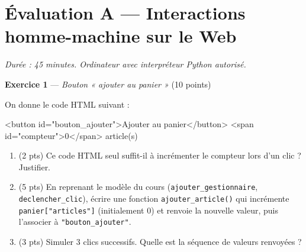 \section*{Évaluation A --- Interactions homme-machine sur le Web}
\textit{Durée : 45 minutes. Ordinateur avec interpréteur Python autorisé.}


\bigskip

\textbf{Exercice 1} --- \textit{Bouton « ajouter au panier »} \hfill (10 points)

On donne le code HTML suivant :
\begin{console}
<button id="bouton_ajouter">Ajouter au panier</button>
<span id="compteur">0</span> article(s)
\end{console}

\begin{enumerate}
  \item (2 pts) Ce code HTML seul suffit-il à incrémenter le compteur lors d'un clic ? Justifier.
  \item (5 pts) En reprenant le modèle du cours (\lstinline{ajouter_gestionnaire}, \lstinline{declencher_clic}), écrire une fonction \lstinline{ajouter_article()} qui incrémente \lstinline{panier["articles"]} (initialement $0$) et renvoie la nouvelle valeur, puis l'associer à \lstinline{"bouton_ajouter"}.
  \item (3 pts) Simuler $3$ clics successifs. Quelle est la séquence de valeurs renvoyées ?
\end{enumerate}


\bigskip

